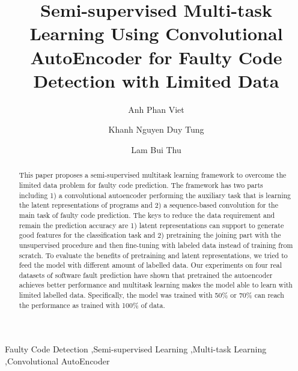 \documentclass[review]{elsarticle}
\begin{document}
\begin{frontmatter}
\title{Semi-supervised Multi-task Learning Using Convolutional AutoEncoder for Faulty Code Detection with Limited Data}

\author{Anh Phan Viet }
\author{Khanh Nguyen Duy Tung}
\author{Lam Bui Thu}
\address{Le Quy Don Technical University, 236 Hoang Quoc Viet St., Hanoi, Vietnam}




\begin{abstract}
This paper proposes a semi-supervised multitask learning framework to overcome the limited data problem for faulty code prediction. The framework has two parts including 1) a convolutional autoencoder performing the auxiliary task that is learning the latent representations of programs and 2) a sequence-based convolution for the main task of faulty code prediction. The keys to reduce the data requirement and remain the prediction accuracy are 1) latent representations can support to generate good features for the classification task and 2) pretraining the joining part with the unsupervised procedure and then fine-tuning with labeled data instead of training from scratch. To evaluate the benefits of pretraining and latent representations, we tried to feed the model with different amount of labelled data. Our experiments on four real datasets of software fault prediction have shown that pretrained the autoencoder achieves better performance and multitask learning makes the model able to learn with limited labelled data. Specifically, the model was trained with 50\% or 70\% can reach the performance as trained with 100\% of data.     
\end{abstract}

\begin{keyword}
Faulty Code Detection \sep Semi-supervised Learning \sep Multi-task Learning \sep Convolutional AutoEncoder 
\end{keyword}

\end{frontmatter}
\end{document}
